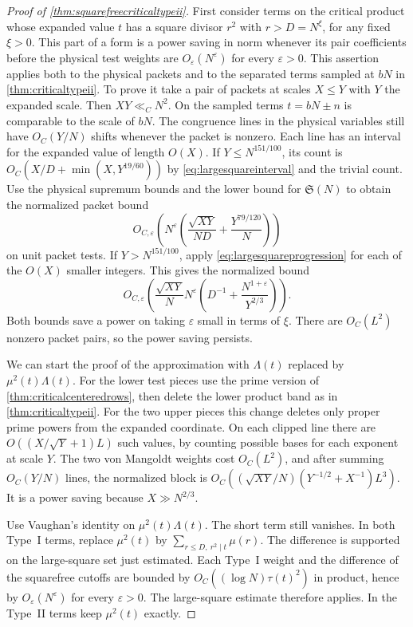 \documentclass[11pt,a4paper]{article}
\numberwithin{equation}{section}
\newcommand{\SSS}{\mathfrak S}
\begin{document}
\begin{proof}[Proof of \cref{thm:squarefreecriticaltypeii}]
First consider terms on the critical product whose expanded
value $t$ has a square divisor $r^2$ with $r>D=N^\xi$,
for any fixed $\xi>0$. This part of a form is a power
saving in norm whenever its pair coefficients before the
physical test weights are $O_\varepsilon(N^\varepsilon)$
for every $\varepsilon>0$. This assertion applies both to
the physical packets and to the separated terms sampled at
$bN$ in \cref{thm:criticaltypeii}. To prove it take a pair
of packets at scales $X\le Y$ with $Y$ the expanded scale.
Then $XY\ll_C N^2$. On the sampled terms $t=bN\pm n$
is comparable to the scale of $bN$. The congruence lines
in the physical variables still have $O_C(Y/N)$ shifts
whenever the packet is nonzero. Each line has an
interval for the expanded value of length $O(X)$.
If $Y\le N^{151/100}$, its count is
$O_C(X/D+\min(X,Y^{19/60}))$ by
\cref{eq:largesquareinterval} and the trivial count.
Use the physical supremum bounds and the lower bound
for $\SSS(N)$ to obtain the normalized packet bound
\[
 O_{C,\varepsilon}\left(
    N^\varepsilon\left(\frac{\sqrt{XY}}{ND}
                        +\frac{Y^{79/120}}{N}\right)\right)
\]
on unit packet tests. If $Y>N^{151/100}$, apply
\cref{eq:largesquareprogression} for each of the $O(X)$
smaller integers. This gives the normalized bound
\[
 O_{C,\varepsilon}\left(
    \frac{\sqrt{XY}}N N^\varepsilon
       \left(D^{-1}+\frac{N^{1+\varepsilon}}{Y^{2/3}}\right)\right).
\]
Both bounds save a power on taking $\varepsilon$
small in terms of $\xi$. There are $O_C(L^2)$
nonzero packet pairs, so the power saving persists.

We can start the proof of the approximation with
$\Lambda(t)$ replaced by $\mu^2(t)\Lambda(t)$.
For the lower test pieces use the prime version of
\cref{thm:criticalcenteredrows}, then delete the lower
product band as in \cref{thm:criticaltypeii}. For the
two upper pieces this change deletes only proper
prime powers from the expanded coordinate. On each
clipped line there are $O((X/\sqrt Y+1)L)$ such values,
by counting possible bases for each exponent at
scale $Y$. The two von Mangoldt weights cost $O_C(L^2)$,
and after summing $O_C(Y/N)$ lines, the normalized
block is
$O_C((\sqrt{XY}/N)(Y^{-1/2}+X^{-1})L^3)$.
It is a power saving because $X\gg N^{2/3}$.

Use Vaughan's identity on $\mu^2(t)\Lambda(t)$.
The short term still vanishes. In both Type~I terms,
replace $\mu^2(t)$ by
$\sum_{r\le D,\ r^2\mid t}\mu(r)$.
The difference is supported on the large-square set
just estimated. Each Type~I weight and the difference
of the squarefree cutoffs are bounded by
$O_C((\log N)\tau(t)^2)$ in product, hence by
$O_\varepsilon(N^\varepsilon)$ for every $\varepsilon>0$.
The large-square estimate therefore applies.
In the Type~II terms keep $\mu^2(t)$ exactly.


\end{proof}
\end{document}
